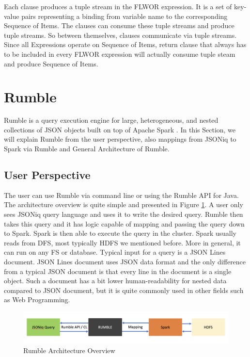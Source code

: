Each clause produces a tuple stream in the FLWOR expression. It is a set of key-value pairs representing a binding from variable name to the corresponding Sequence of Items. The clauses can consume these tuple streams and produce tuple streams. So between themselves, clauses communicate via tuple streams. Since all Expressions operate on Sequence of Items, return clause that always has to be included in every FLWOR expression will actually consume tuple steam and produce Sequence of Items. \cite{JSONiqBook}
   
\section{Rumble}
Rumble is a query execution engine for large, heterogeneous, and nested collections of JSON objects built on top of Apache Spark \cite{RumblePaper}. In this Section, we will explain Rumble from the user perspective, also mappings from JSONiq to Spark via Rumble and General Architecture of Rumble.
\subsection{User Perspective}
The user can use Rumble via command line or using the Rumble API for Java. The architecture overview is quite simple and presented in Figure \ref{fig:Rumble_Architecture}. A user only sees JSONiq query language and uses it to write the desired query. Rumble then takes this query and it has logic capable of mapping and passing the query down to Spark. Spark is then able to execute the query in the cluster. Spark usually reads from DFS, most typically HDFS we mentioned before. More in general, it can run on any FS or database. Typical input for a query is a JSON Lines document. JSON Lines document uses JSON data format and the only difference from a typical JSON document is that every line in the document is a single object. Such a document has a bit lower human-readability for nested data compared to JSON document, but it is quite commonly used in other fields such as Web Programming. \cite{RumbleYouTube}

\begin{figure}[h!]
	\vspace*{-5mm}
	\includegraphics[width=\linewidth]{rumble_architecture.png}
	\vspace*{-10mm}
	\caption{Rumble Architecture Overview}
	\label{fig:Rumble_Architecture}
\end{figure}

